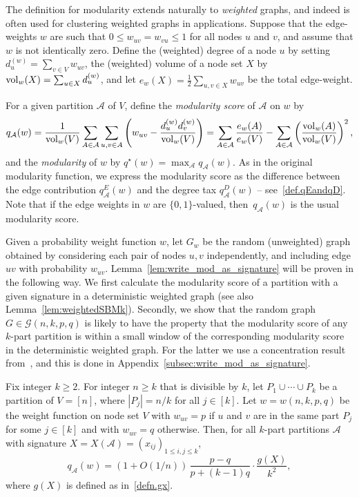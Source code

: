 \documentclass[a4paper,UKenglish,cleveref, autoref, thm-restate,numberwithinsect]{lipics-v2021}
\newcommand{\cA}{\mathcal{A}}
\newcommand{\vol}{{\rm vol}}
\newcommand{\Fc}{
}
\begin{document}
The definition for modularity extends naturally to \emph{weighted} graphs, and indeed is often used for clustering  weighted graphs in applications. Suppose that the edge-weights $w$ are such that
$0\leq w_{uv}=w_{vu} \leq 1$ for all nodes $u$ and $v$, and assume that $w$ is not identically zero.  
Define the (weighted) degree of a node $u$ by setting $d_u^{(w)}=\sum_{v\in V} w_{uv} $, the (weighted) volume of a node set $X$ by $\vol_w (X) = \sum_{u \in X} d_u^{(w)}$, and let $e_w(X)= \tfrac12 \sum_{u,v \in X} w_{uv}$ be the total edge-weight. 
%

For a given partition $\cA$ of $V$, define the \emph{modularity score} of $\cA$ on $w$ by \begin{eqnarray}
q_\cA(w) = 
\frac{1}{\vol_w(V)}\sum_{A\in \cA} \sum_{u,v \in A} \left(w_{uv} -\frac{d^{(w)}_u d^{(w)}_v}{\vol_w(V)}\right) 
= \sum_{A\in \cA} \frac {e_w(A)}{e_w(V)} - \sum_{A\in \cA} \left( \frac {\vol_w(A)}{\vol_w(V)} \right)^2, \label{eq:modularity_weights}
\end{eqnarray}
%
and the \emph{modularity} of $w$ by $q^{\star}(w)=\max_{\cA} q_{\cA}(w)$.
{\Fc As in the original modularity function, we express the modularity score as the difference between the edge contribution $q^E_\cA(w)$ and the degree tax $q^D_\cA(w)$ -- see~\eqref{def.qEandqD}.}
Note that if the edge weights in $w$ are $\{0,1\}$-valued, then~$q_{\cA}(w)$ is the usual modularity score. 

Given a probability weight function $w$, let $G_{w}$ be the random (unweighted) graph obtained by considering each pair of nodes $u,v$ independently, and including edge $uv$ with probability $w_{uv}$.
Lemma~\ref{lem:write_mod_as_signature} will be proven in the following way. We first calculate the modularity score of a partition with a given signature in a deterministic weighted graph (see also Lemma~\ref{lem:weightedSBMk}). Secondly, we show that the random graph $G \in \mathcal{G}(n,k,p,q)$ is likely to have the property that the modularity score of any $k$-part partition is within a small window of the  corresponding modularity score in the deterministic weighted graph. For the latter we use a concentration result from~\cite{sampling}, and this is done in Appendix~\ref{subsec:write_mod_as_signature}. 



\begin{lemma}\label{lem:weightedSBMk}
Fix integer $k \ge 2$. For integer $n \ge k$ that is divisible by $k$, let $P_1 \cup \cdots \cup P_k$ be a partition of $V=[n]$, where $|P_j| = n/k$ for all $j \in [k]$. 
Let $w=w(n, k, p, q)$ be the weight function on node set $V$ with $w_{uv}=p$ if $u$ and $v$ are in the same part $P_j$ for some $j \in [k]$ and with $w_{uv}=q$ otherwise. Then, for all $k$-part partitions $\cA$ with signature $X=X(\cA)=(x_{ij})_{1 \le i,j \le k}$, 
\[
q_\cA(w) = (1+O(1/n)) \, \frac{p-q}{p+(k-1)q} \cdot \frac {g(X)}{k^2},
\] 
where $g(X)$ is defined as in~\eqref{defn.gx}.
\end{lemma}
\end{document}
